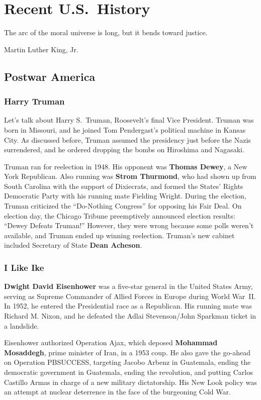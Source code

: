 \chapter{Recent U.S.\ History}

\epigraph{%
  The arc of the moral universe is long, but it bends toward justice.
}{Martin Luther King, Jr.}

\section{Postwar America}

\subsection*{Harry Truman}

Let's talk about Harry S.\ Truman, Roosevelt's final Vice President.
Truman was born in Missouri, and he joined Tom Pendergast's political machine in Kansas City.
As discussed before, Truman assumed the presidency just before the Nazis surrendered,
and he ordered dropping the bombs on Hiroshima and Nagasaki.

Truman ran for reelection in 1948.
His opponent was \textbf{Thomas Dewey}, a New York Republican.
Also running was \textbf{Strom Thurmond}, who had shown up from South Carolina with the support of Dixiecrats,
and formed the States' Rights Democratic Party with his running mate Fielding Wright.
During the election, Truman criticized the ``Do-Nothing Congress'' for opposing his Fair Deal.
On election day, the Chicago Tribune preemptively announced election results: ``Dewey Defeats Truman!''
However, they were wrong because some polls weren't available, and Truman ended up winning reelection.
Truman's new cabinet included Secretary of State \textbf{Dean Acheson}.

\subsection*{I Like Ike}

\textbf{Dwight David Eisenhower} was a five-star general in the United States Army,
serving as Supreme Commander of Allied Forces in Europe during World War~II\@.
In 1952, he entered the Presidential race as a Republican.
His running mate was Richard M. Nixon, and he defeated the Adlai Stevenson/John Sparkman ticket in a landslide.

Eisenhower authorized Operation Ajax,
which deposed \textbf{Mohammad Mosaddegh}, prime minister of Iran, in a 1953 coup.
He also gave the go-ahead on Operation PBSUCCESS, targeting Jacobo Arbenz in Guatemala,
ending the democratic government in Guatemala, ending the revolution,
and putting Carlos Castillo Armas in charge of a new military dictatorship.
His New Look policy was an attempt at nuclear deterrence in the face of the burgeoning Cold War.

